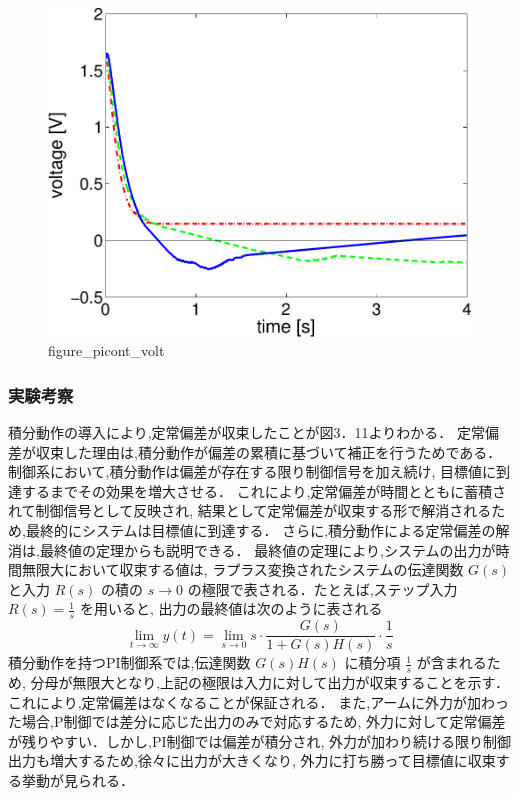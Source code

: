 \begin{figure}[h]
  \centering
  \includegraphics[scale=0.5]{sozai/figure_picont_volt-crop.pdf}
  \caption{figure\_picont\_volt}
\end{figure}

\newpage

\subsubsection{実験考察}
積分動作の導入により,定常偏差が収束したことが図3．11よりわかる．
定常偏差が収束した理由は,積分動作が偏差の累積に基づいて補正を行うためである．
制御系において,積分動作は偏差が存在する限り制御信号を加え続け,
目標値に到達するまでその効果を増大させる．
これにより,定常偏差が時間とともに蓄積されて制御信号として反映され,
結果として定常偏差が収束する形で解消されるため,最終的にシステムは目標値に到達する．
さらに,積分動作による定常偏差の解消は,最終値の定理からも説明できる．
最終値の定理により,システムの出力が時間無限大において収束する値は,
ラプラス変換されたシステムの伝達関数 \( G(s) \) と入力 \( R(s) \) の積の 
\( s \to 0 \) の極限で表される．たとえば,ステップ入力 \( R(s) = \frac{1}{s} \) を用いると,
出力の最終値は次のように表される
\[
  \lim_{t \to \infty} y(t) = \lim_{s \to 0} s \cdot \frac{G(s)}{1 + G(s)H(s)} \cdot \frac{1}{s}
\]
積分動作を持つPI制御系では,伝達関数 \( G(s)H(s) \) に積分項 \(\frac{1}{s}\) が含まれるため,
分母が無限大となり,上記の極限は入力に対して出力が収束することを示す．
これにより,定常偏差はなくなることが保証される．
また,アームに外力が加わった場合,P制御では差分に応じた出力のみで対応するため,
外力に対して定常偏差が残りやすい．しかし,PI制御では偏差が積分され,
外力が加わり続ける限り制御出力も増大するため,徐々に出力が大きくなり,
外力に打ち勝って目標値に収束する挙動が見られる．

